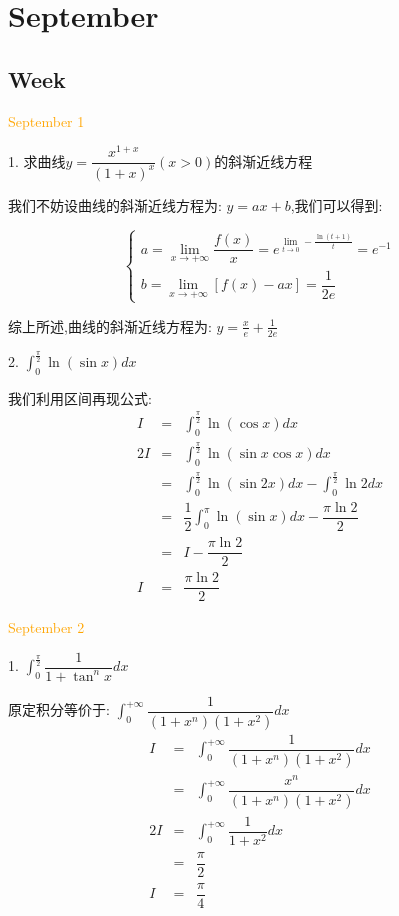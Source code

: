 \chapter{September}
\section{Week }
\textcolor{orange}{September 1}

1. 求曲线$y=\dfrac{x^{1+x}}{(1+x)^x}(x>0)$的斜渐近线方程
\begin{solution}

	我们不妨设曲线的斜渐近线方程为:  $y=ax+b$,我们可以得到:  
	
	$$\left\lbrace
	\begin{array}{l}
		a=\lim\limits_{x\to +\infty}\dfrac{f(x)}{x}=e^{\lim\limits_{t\to 0}-\frac{\ln(t+1)}{t}}=e^{-1}\\
		b=\lim\limits_{x\to +\infty}[f(x)-ax]=\dfrac{1}{2e}
	\end{array}
	\right. $$
	
	综上所述,曲线的斜渐近线方程为:  $y=\frac{x}{e}+\frac{1}{2e}$
\end{solution}

2. $\int_{0}^{\frac{\pi}{2}}\ln(\sin x)dx$
\begin{solution}

	我们利用区间再现公式:  
	\begin{eqnarray*}
		I&=&\int_{0}^{\frac{\pi}{2}}\ln(\cos x)dx\\
		2I&=&\int_{0}^{\frac{\pi}{2}}\ln(\sin x\cos x)dx\\
		&=&\int_{0}^{\frac{\pi}{2}}\ln(\sin 2x)dx-\int_{0}^{\frac{\pi}{2}}\ln2dx\\
		&=&\dfrac{1}{2}\int_{0}^{\pi}\ln(\sin x)dx-\dfrac{\pi \ln 2}{2}\\
		&=&I-\dfrac{\pi \ln 2}{2}\\
		I&=&\dfrac{\pi \ln 2}{2}
	\end{eqnarray*}
\end{solution}

\textcolor{orange}{September 2}

1. $\int_{0}^{\frac{\pi}{2}}\dfrac{1}{1+\tan^{n}x}dx$
\begin{solution}

	原定积分等价于:  $\int_{0}^{+\infty}\dfrac{1}{(1+x^{n})(1+x^2)}dx$
	\begin{eqnarray*}
		I&=&\int_{0}^{+\infty}\dfrac{1}{(1+x^{n})(1+x^2)}dx\\
		&=&\int_{0}^{+\infty}\dfrac{x^n}{(1+x^{n})(1+x^2)}dx\\
		2I&=&\int_{0}^{+\infty}\dfrac{1}{1+x^2}dx\\
		&=&\dfrac{\pi}{2}\\
		I&=&\dfrac{\pi}{4}
	\end{eqnarray*}
\end{solution}

